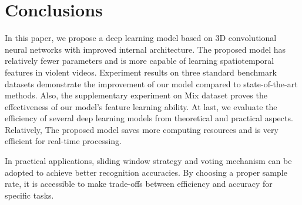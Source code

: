 \documentclass[10pt,twocolumn,letterpaper]{article}
\begin{document}
\section{Conclusions}
\label{sec:5}

In this paper, we propose a deep learning model based on 3D convolutional neural networks with improved internal architecture. 
The proposed model has relatively fewer parameters and is more capable of learning spatiotemporal features in violent videos. 
Experiment results on three standard benchmark datasets demonstrate the improvement of our model compared to state-of-the-art methods. 
Also, the supplementary experiment on Mix dataset proves the effectiveness of our model's feature learning ability. 
At last, we evaluate the efficiency of several deep learning models from theoretical and practical aspects. 
Relatively, The proposed model saves more computing resources and is very efficient for real-time processing. 

In practical applications, sliding window strategy and voting mechanism can be adopted to achieve better recognition accuracies. 
By choosing a proper sample rate, it is accessible to make trade-offs between efficiency and accuracy for specific tasks.

{\small


}


\rule{0pt}{1pt}\newpage
\end{document}
